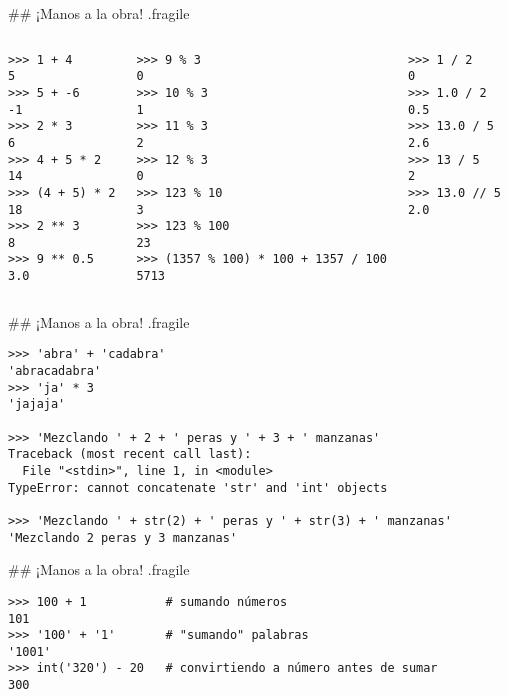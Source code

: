 ## ¡Manos a la obra! {.fragile}


\vspace{-3ex}
\begin{columns}[onlytextwidth,t]
\begin{lstlisting}
>>> 1 + 4
5
>>> 5 + -6
-1
>>> 2 * 3
6
>>> 4 + 5 * 2
14
>>> (4 + 5) * 2
18
>>> 2 ** 3
8
>>> 9 ** 0.5
3.0
\end{lstlisting}
\begin{lstlisting}[breaklines=false]
>>> 9 % 3
0
>>> 10 % 3
1
>>> 11 % 3
2
>>> 12 % 3
0
>>> 123 % 10
3
>>> 123 % 100
23
>>> (1357 % 100) * 100 + 1357 / 100
5713
\end{lstlisting}
\begin{lstlisting}
>>> 1 / 2
0
>>> 1.0 / 2
0.5
>>> 13.0 / 5
2.6
>>> 13 / 5
2
>>> 13.0 // 5
2.0
\end{lstlisting}
\end{columns}


## ¡Manos a la obra! {.fragile}

\begin{lstlisting}
>>> 'abra' + 'cadabra'
'abracadabra'
>>> 'ja' * 3
'jajaja'

>>> 'Mezclando ' + 2 + ' peras y ' + 3 + ' manzanas'
Traceback (most recent call last):
  File "<stdin>", line 1, in <module>
TypeError: cannot concatenate 'str' and 'int' objects

>>> 'Mezclando ' + str(2) + ' peras y ' + str(3) + ' manzanas'
'Mezclando 2 peras y 3 manzanas'
\end{lstlisting}

## ¡Manos a la obra! {.fragile}

\begin{lstlisting}
>>> 100 + 1           # sumando números
101
>>> '100' + '1'       # "sumando" palabras
'1001'
>>> int('320') - 20   # convirtiendo a número antes de sumar
300

\end{lstlisting}
